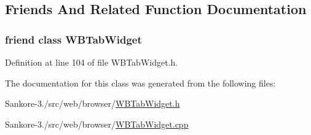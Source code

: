 \subsection{Friends And Related Function Documentation}
\hypertarget{class_w_b_tab_bar_abff7b061276b5d2a7cdd9019d925059b}{
\subsubsection[{W\-B\-Tab\-Widget}]{\setlength{\rightskip}{0pt plus 5cm}friend class {\bf W\-B\-Tab\-Widget}\hspace{0.3cm}{\ttfamily [friend]}}}\label{df/d78/class_w_b_tab_bar_abff7b061276b5d2a7cdd9019d925059b}


Definition at line 104 of file W\-B\-Tab\-Widget.\-h.



The documentation for this class was generated from the following files\-:\begin{DoxyCompactItemize}
\item 
Sankore-\/3./src/web/browser/\hyperlink{_w_b_tab_widget_8h}{W\-B\-Tab\-Widget.\-h}\item 
Sankore-\/3./src/web/browser/\hyperlink{_w_b_tab_widget_8cpp}{W\-B\-Tab\-Widget.\-cpp}\end{DoxyCompactItemize}
